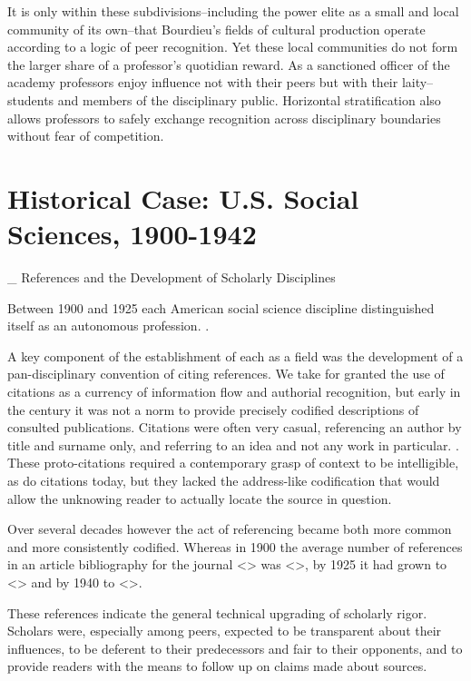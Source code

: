 It is only within these subdivisions--including the power elite as a
small and local community of its own--that Bourdieu's fields of cultural
production operate according to a logic of peer recognition. Yet these
local communities do not form the larger share of a professor's
quotidian reward. As a sanctioned officer of the academy professors
enjoy influence not with their peers but with their laity--students and
members of the disciplinary public. Horizontal stratification also
allows professors to safely exchange recognition across disciplinary
boundaries without fear of competition.

\section{Historical Case: U.S. Social Sciences,
1900-1942}\label{historical-case-u.s.-social-sciences-1900-1942}

\_ References and the Development of Scholarly Disciplines

Between 1900 and 1925 each American social science discipline
distinguished itself as an autonomous profession. .

A key component of the establishment of each as a field was the
development of a pan-disciplinary convention of citing references. We
take for granted the use of citations as a currency of information flow
and authorial recognition, but early in the century it was not a norm to
provide precisely codified descriptions of consulted publications.
Citations were often very casual, referencing an author by title and
surname only, and referring to an idea and not any work in particular. .
These proto-citations required a contemporary grasp of context to be
intelligible, as do citations today, but they lacked the address-like
codification that would allow the unknowing reader to actually locate
the source in question.

Over several decades however the act of referencing became both more
common and more consistently codified. Whereas in 1900 the average
number of references in an article bibliography for the journal
\textless{}\textgreater{} was \textless{}\textgreater{}, by 1925 it had
grown to \textless{}\textgreater{} and by 1940 to
\textless{}\textgreater{}.

These references indicate the general technical upgrading of scholarly
rigor. Scholars were, especially among peers, expected to be transparent
about their influences, to be deferent to their predecessors and fair to
their opponents, and to provide readers with the means to follow up on
claims made about sources.

